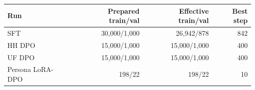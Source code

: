 \small
\begin{tabular}{lrrr}
\toprule
Run & Prepared train/val & Effective train/val & Best step \\
\midrule
SFT & 30,000/1,000 & 26,942/878 & 842 \\
HH DPO & 15,000/1,000 & 15,000/1,000 & 400 \\
UF DPO & 15,000/1,000 & 15,000/1,000 & 400 \\
Persona LoRA-DPO & 198/22 & 198/22 & 10 \\
\bottomrule
\end{tabular}
